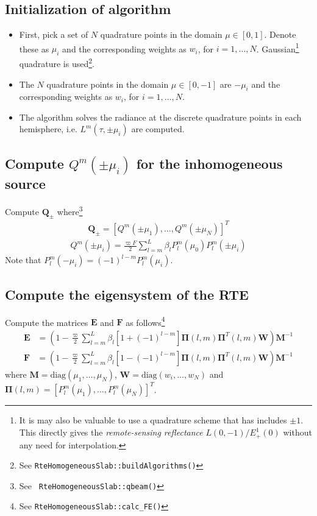 \documentclass[11pt]{article}
\newcommand{\mvec}[1]{\mathbf{#1}}
\newcommand{\gvec}[1]{\boldsymbol{#1}}
\begin{document}
\subsection{Initialization of algorithm}
\begin{itemize}
\item First, pick a set of $N$ quadrature points in the domain $\mu
  \in[0,1]$. Denote these as $\mu_i$ and the corresponding weights
  as $w_i$, for $i=1,\ldots,N$. Gaussian\footnote{It is may also be
    valuable to use a quadrature scheme that has includes $\pm
    1$. This directly gives the \emph{remote-sensing reflectance}
    $L(0,-1)/E_+^1(0)$ without any need for interpolation.}
  quadrature is used\footnote{See {\tt RteHomogeneousSlab::buildAlgorithms()}}.
\item The $N$ quadrature points in the domain $\mu \in[0,-1]$ are
  $-\mu_i$ and the corresponding weights as $w_i$, for
  $i=1,\ldots,N$.
\item The algorithm solves the radiance at the discrete quadrature
  points in each hemisphere, i.e. $L^m(\tau,\pm \mu_i)$ are
  computed.
\end{itemize}





\subsection{Compute $Q^m(\pm \mu_i)$ for the inhomogeneous source}
Compute $\mvec{Q}_\pm$ where\footnote{See {\tt
    RteHomogeneousSlab::qbeam()}}
\begin{align}
  \mvec{Q}_\pm = [Q^m(\pm\mu_1), \ldots, Q^m(\pm\mu_N)]^T
\end{align}
\begin{align}
  Q^m(\pm \mu_i) = \frac{\varpi F}{2}
  \sum_{l=m}^L \beta_l P^m_l(\mu_0) P_l^m(\pm \mu_i)
\end{align}
Note that $P_l^m(-\mu_i) = (-1)^{l-m}P_l^m(\mu_i)$.




\subsection{Compute the eigensystem of the RTE}
Compute the matrices $\mvec{E}$ and $\mvec{F}$ as
follows\footnote{See {\tt RteHomogeneousSlab::calc\_FE()}}
\begin{align}
  \mvec{E} &= \left(
    1-\frac{\varpi}{2}\sum_{l=m}^L
    \beta_l
    \left[1+(-1)^{l-m}\right] 
    \gvec{\Pi}(l,m) \gvec{\Pi}^T(l,m) \mvec{W}
  \right)
  \mvec{M}^{-1}
\end{align}
\begin{align}
  \mvec{F} &= \left(
    1-\frac{\varpi}{2}\sum_{l=m}^L
    \beta_l
    \left[1-(-1)^{l-m}\right] 
    \gvec{\Pi}(l,m) \gvec{\Pi}^T(l,m) \mvec{W}
  \right)
  \mvec{M}^{-1}
\end{align}
where $\mvec{M} = \textrm{diag}(\mu_1,\ldots,\mu_N)$, $\mvec{W} =
\textrm{diag}(w_i,\ldots,w_N)$ and $\gvec{\Pi}(l,m) =
[P_l^m(\mu_1),\ldots,P_l^m(\mu_N)]^T$.
\end{document}
